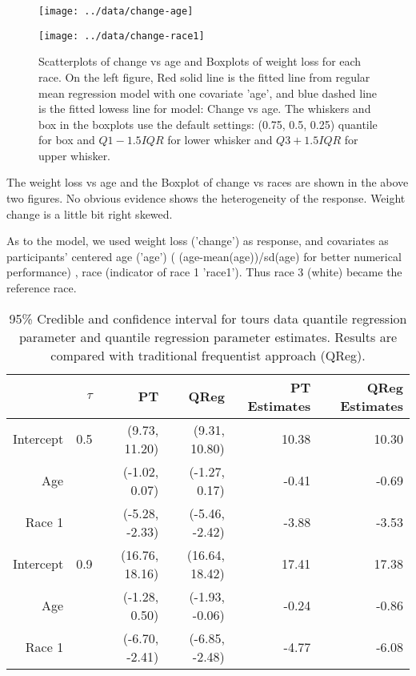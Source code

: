 \documentclass[12pt]{article}
\begin{document}
\begin{figure}[h]
  \begin{minipage}{0.5\linewidth}
    \centerline{\texttt{[image: ../data/change-age]}}
  \end{minipage}
  \begin{minipage}{0.5\linewidth}
    \centerline{\texttt{[image: ../data/change-race1]}}
  \end{minipage}

  \caption[]{\label{fig:tours} Scatterplots of change vs age and
    Boxplots of weight loss for each race. On the left figure, Red
    solid line is the   fitted line from regular mean regression model
    with one covariate   'age', and blue dashed line is the fitted
    lowess line for model:  Change vs age. The whiskers and box in the
    boxplots use the default settings: (0.75, 0.5, 0.25) quantile for
    box and $Q1-1.5IQR$ for lower whisker and $Q3+1.5IQR$ for upper
    whisker. }
\end{figure}

The  weight loss vs age and the Boxplot of change vs races are
shown in the above two figures. No obvious evidence shows the
heterogeneity of the response. Weight change is a little bit right
skewed. 

As to the model, we used weight loss ('change') as response, and
covariates as participants' centered age ('age') (
(age-mean(age))/sd(age) for better numerical performance) , race
(indicator of race 1 'race1'). Thus race 3 (white) became the
reference race.

\begin{table}[h]
  \caption[]{\label{tab:tours} 95\% Credible and confidence interval for
    tours data quantile regression parameter and quantile regression
    parameter estimates. Results are compared with
    traditional frequentist approach (QReg).}
  \vspace{4mm}

  \centering
  \begin{tabular}{r|r|rrrr}
    \hline
    & $\tau$ & PT              & QReg             & PT Estimates
    & QReg Estimates                                        \\
    \hline
    Intercept & 0.5    & (9.73, 11.20)    & (9.31, 10.80)    & 10.38 & 10.30\\
    Age       &        & (-1.02, 0.07)  & (-1.27, 0.17)    & -0.41 & -0.69\\
    Race 1    &        & (-5.28, -2.33)  & (-5.46, -2.42)   & -3.88 & -3.53\\
    \hline
    Intercept & 0.9    & (16.76, 18.16)  & (16.64, 18.42)  & 17.41 & 17.38\\
    Age       &        & (-1.28, 0.50)   & (-1.93, -0.06)  & -0.24 & -0.86 \\
    Race 1    &        & (-6.70, -2.41) & (-6.85, -2.48) & -4.77 & -6.08\\
    \hline 
  \end{tabular}
\end{table}
\end{document}
